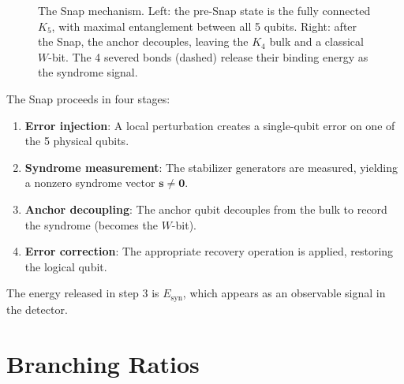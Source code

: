\documentclass[11pt,a4paper]{article}
\theoremstyle{definition}
\theoremstyle{remark}
\newcommand{\Esyn}{E_{\mathrm{syn}}}
\begin{document}
\begin{figure}[H]
\caption{The Snap mechanism. Left: the pre-Snap state is the fully connected $K_5$, with maximal entanglement between all 5 qubits. Right: after the Snap, the anchor decouples, leaving the $K_4$ bulk and a classical $W$-bit. The 4 severed bonds (dashed) release their binding energy as the syndrome signal.}
\label{fig:snap}
\end{figure}

The Snap proceeds in four stages:
\begin{enumerate}[nosep]
\item \textbf{Error injection}: A local perturbation creates a single-qubit error on one of the 5 physical qubits.
\item \textbf{Syndrome measurement}: The stabilizer generators are measured, yielding a nonzero syndrome vector $\mathbf{s} \neq \mathbf{0}$.
\item \textbf{Anchor decoupling}: The anchor qubit decouples from the bulk to record the syndrome (becomes the $W$-bit).
\item \textbf{Error correction}: The appropriate recovery operation is applied, restoring the logical qubit.
\end{enumerate}

The energy released in step 3 is $\Esyn$, which appears as an observable signal in the detector.

\section{Branching Ratios}
\label{sec:branching}
\end{document}
